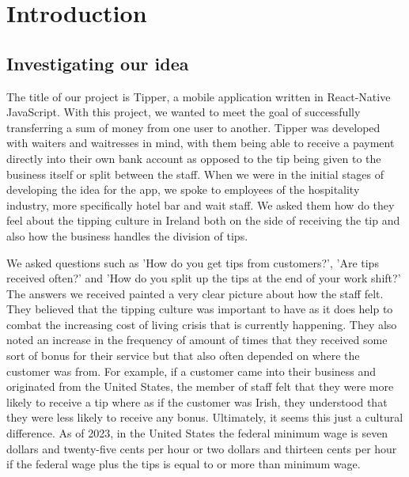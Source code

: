 \chapter{Introduction}
\section{Investigating our idea}
The title of our project is Tipper, a mobile application written in React-Native JavaScript. With this project, we wanted to meet the goal of successfully transferring a sum of money from one user to another. Tipper was developed with waiters and waitresses in mind, with them being able to receive a payment directly into their own bank account as opposed to the tip being given to the business itself or split between the staff. When we were in the initial stages of developing the idea for the app, we spoke to employees of the hospitality industry, more specifically hotel bar and wait staff. We asked them how do they feel about the tipping culture in Ireland both on the side of receiving the tip and also how the business handles the division of tips.

We asked questions such as 'How do you get tips from customers?', 'Are tips received often?' and 'How do you split up the tips at the end of your work shift?' The answers we received painted a very clear picture about how the staff felt. They believed that the tipping culture was important to have as it does help to combat the increasing cost of living crisis that is currently happening. They also noted an increase in the frequency of amount of times that they received some sort of bonus for their service but that also often depended on where the customer was from. For example, if a customer came into their business and originated from the United States, the member of staff felt that they were more likely to receive a tip where as if the customer was Irish, they understood that they were less likely to receive any bonus. Ultimately, it seems this just a cultural difference. As of 2023, in the United States the federal minimum wage is seven dollars and twenty-five cents per hour or two dollars and thirteen cents per hour if the federal wage plus the tips is equal to or more than minimum wage\cite{MinWageUS}. 

